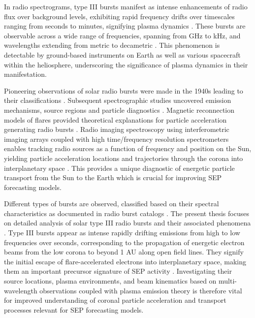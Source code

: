 In radio spectrograms, type III bursts manifest as intense enhancements of radio flux over background levels, exhibiting rapid frequency drifts over timescales ranging from seconds to minutes, signifying plasma dynamics \citep{reid_2017}. These bursts are observable across a wide range of frequencies, spanning from GHz to kHz, and wavelengths extending from metric to decametric \citep{wild_1950a, lecacheux_1989, bonnin_2008}. This phenomenon is detectable by ground-based instruments on Earth as well as various spacecraft within the heliosphere, underscoring the significance of plasma dynamics in their manifestation.

Pioneering observations of solar radio bursts were made in the 1940s leading to their classifications \citep{wild_1963}. Subsequent spectrographic studies uncovered emission mechanisms, source regions and particle diagnostics \citep{suzuki_1985}. Magnetic reconnection models of flares provided theoretical explanations for particle acceleration generating radio bursts \citep{holman_2011}. Radio imaging spectroscopy using interferometric imaging arrays coupled with high time/frequency resolution spectrometers enables tracking radio sources as a function of frequency and position on the Sun, yielding particle acceleration locations and trajectories through the corona into interplanetary space \citep{krucker_2011, klassen_2003a, klassen_2003b}. This provides a unique diagnostic of energetic particle transport from the Sun to the Earth which is crucial for improving SEP forecasting models.

Different types of bursts are observed, classified based on their spectral characteristics as documented in radio burst catalogs \citep{wild_1963}. The present thesis focuses on detailed analysis of solar type III radio bursts and their associated phenomena \citep{reid_2014}. Type III bursts appear as intense rapidly drifting emissions from high to low frequencies over seconds, corresponding to the propagation of energetic electron beams from the low corona to beyond 1 AU along open field lines. They signify the initial escape of flare-accelerated electrons into interplanetary space, making them an important precursor signature of SEP activity \citep{cane_2002, macdowall_2003}. Investigating their source locations, plasma environments, and beam kinematics based on multi-wavelength observations coupled with plasma emission theory is therefore vital for improved understanding of coronal particle acceleration and transport processes relevant for SEP forecasting models.

